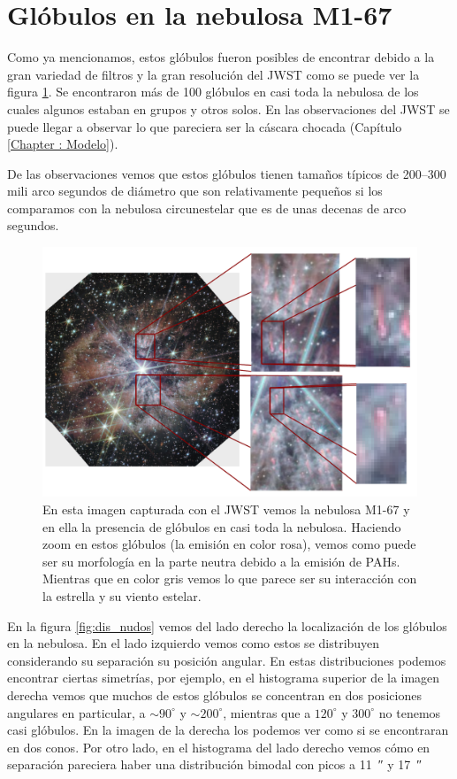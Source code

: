 \documentclass{book}
\begin{document}
\section{Glóbulos en la nebulosa M1-67}

Como ya mencionamos, estos glóbulos fueron posibles de encontrar debido a la gran variedad de filtros y la gran resolución del JWST como se puede ver la figura \ref{fig:nudos WR124}. Se encontraron más de 100 glóbulos en casi toda la nebulosa de los cuales algunos estaban en grupos y otros solos. En las observaciones del JWST se puede llegar a observar lo que pareciera ser la cáscara chocada (Capítulo \ref{Chapter : Modelo}).

De las observaciones vemos que estos glóbulos tienen tamaños típicos de 200--300 mili arco segundos de diámetro que son relativamente pequeños si los comparamos con la nebulosa circunestelar que es de unas decenas de arco segundos.

\begin{figure}[htb]
    \centering
    \includegraphics[width=\textwidth]{Nuevas imagenes finales/Globulos_JWS_1.pdf}
    \caption{En esta imagen capturada con el JWST vemos la nebulosa M1-67 y en ella la presencia de glóbulos en casi toda la nebulosa. Haciendo zoom en estos glóbulos (la emisión en color rosa), vemos como puede ser su morfología en la parte neutra debido a la emisión de PAHs. Mientras que en color gris vemos lo que parece ser su interacción con la estrella y su viento estelar.}
    \label{fig:nudos WR124}
\end{figure}

En la figura \ref{fig:dis_nudos} vemos del lado derecho la localización de los glóbulos en la nebulosa. En el lado izquierdo vemos como estos se distribuyen considerando su separación  su posición angular. En estas distribuciones podemos encontrar ciertas simetrías, por ejemplo, en el histograma superior de la imagen derecha vemos que muchos de estos glóbulos se concentran en dos posiciones angulares en particular, a $\sim90^\circ$ y $\sim200^\circ$, mientras que a $120^\circ$ y $300^\circ$ no tenemos casi glóbulos. En la imagen de la derecha los podemos ver como si se encontraran en dos conos. Por otro lado, en el histograma del lado derecho vemos cómo en separación pareciera haber una distribución bimodal con picos a \SI{11}{\arcsecond} y \SI{17}{\arcsecond}
\end{document}
